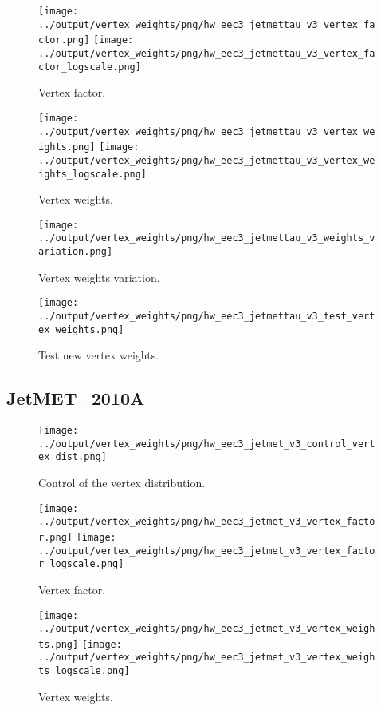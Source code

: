 \documentclass[11pt]{book}
\begin{document}
\begin{figure}[ht]
\centering
\texttt{[image: ../output/vertex\_weights/png/hw\_eec3\_jetmettau\_v3\_vertex\_factor.png]}
\texttt{[image: ../output/vertex\_weights/png/hw\_eec3\_jetmettau\_v3\_vertex\_factor\_logscale.png]}
\caption{Vertex factor.}
\end{figure}

\begin{figure}[ht]
\centering
\texttt{[image: ../output/vertex\_weights/png/hw\_eec3\_jetmettau\_v3\_vertex\_weights.png]}
\texttt{[image: ../output/vertex\_weights/png/hw\_eec3\_jetmettau\_v3\_vertex\_weights\_logscale.png]}
\caption{Vertex weights.}
\end{figure}

\begin{figure}[ht]
\centering
\texttt{[image: ../output/vertex\_weights/png/hw\_eec3\_jetmettau\_v3\_weights\_variation.png]}
\caption{Vertex weights variation.}
\end{figure}

\begin{figure}[ht]
\centering
\texttt{[image: ../output/vertex\_weights/png/hw\_eec3\_jetmettau\_v3\_test\_vertex\_weights.png]}
\caption{Test new vertex weights.}
\end{figure}
\clearpage

\subsection{JetMET\_2010A}
\begin{figure}[ht]
\centering
\texttt{[image: ../output/vertex\_weights/png/hw\_eec3\_jetmet\_v3\_control\_vertex\_dist.png]}
\caption{Control of the vertex distribution.}
\end{figure}

\begin{figure}[ht]
\centering
\texttt{[image: ../output/vertex\_weights/png/hw\_eec3\_jetmet\_v3\_vertex\_factor.png]}
\texttt{[image: ../output/vertex\_weights/png/hw\_eec3\_jetmet\_v3\_vertex\_factor\_logscale.png]}
\caption{Vertex factor.}
\end{figure}

\begin{figure}[ht]
\centering
\texttt{[image: ../output/vertex\_weights/png/hw\_eec3\_jetmet\_v3\_vertex\_weights.png]}
\texttt{[image: ../output/vertex\_weights/png/hw\_eec3\_jetmet\_v3\_vertex\_weights\_logscale.png]}
\caption{Vertex weights.}
\end{figure}
\end{document}
